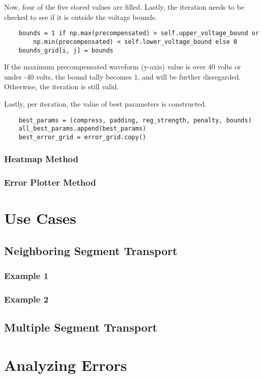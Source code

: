 Now, four of the five stored values are filled. Lastly, the iteration needs to be checked to see if it is outside the voltage bounds.

\begin{verbatim}
    bounds = 1 if np.max(precompensated) > self.upper_voltage_bound or 
        np.min(precompensated) < self.lower_voltage_bound else 0
    bounds_grid[i, j] = bounds
\end{verbatim}

If the maximum precompensated waveform (y-axis) value is over 40 volts or under -40 volts, the bound tally becomes 1, and will be further disregarded. Otherwise, the iteration is still valid.

Lastly, per iteration, the value of best parameters is constructed.
\begin{verbatim}
    best_params = (compress, padding, reg_strength, penalty, bounds)
    all_best_params.append(best_params)
    best_error_grid = error_grid.copy()
\end{verbatim}

\subsubsection{Heatmap Method}
\subsubsection{Error Plotter Method}

\section{Use Cases}
\subsection{Neighboring Segment Transport}
\subsubsection{Example 1}
\subsubsection{Example 2}
\subsection{Multiple Segment Transport}

\section{Analyzing Errors}
